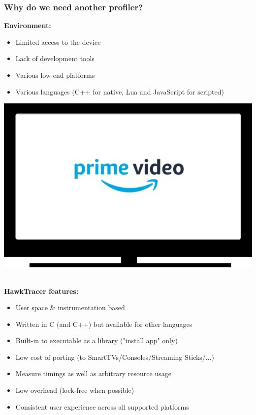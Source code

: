 \documentclass{beamer}
\begin{document}
\begin{frame}[fragile]
  \frametitle{Why do we need another profiler?}
  \begin{minipage}[c]{0.65\linewidth}
  \textbf{Environment:}
  \begin{itemize}
    \item Limited access to the device
    \item Lack of development tools
    \item Various low-end platforms
    \item Various languages (C++ for native, Lua and JavaScript for scripted)
  \end{itemize}
  \end{minipage}
  \begin{minipage}[c]{0.3\linewidth}
    \includegraphics[width=1\textwidth]{img/prime-video.png}
  \end{minipage}
  \pause \\
  \vspace{0.7em}
  \textbf{HawkTracer features:}
  \begin{itemize}
    \item User space \& instrumentation based
    \item Written in C (and C++) but available for other languages
    \item Built-in to executable as a library ("install app" only)
    \item Low cost of porting (to SmartTVs/Consoles/Streaming Sticks/...)
    \item Measure timings as well as arbitrary resource usage
    \item Low overhead (lock-free when possible)
    \item Consistent user experience across all supported platforms
  \end{itemize}
\end{frame}
\end{document}
